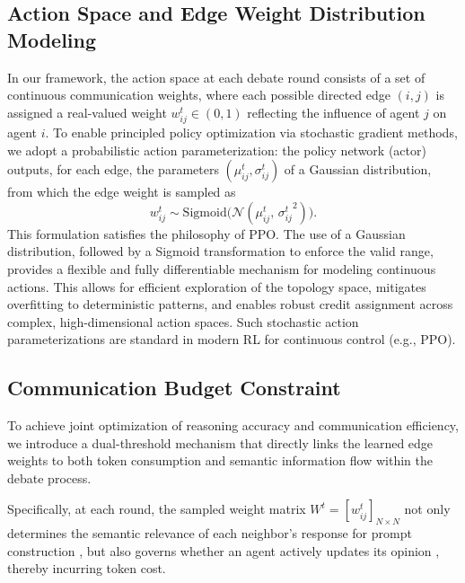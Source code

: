 \subsection{Action Space and Edge Weight Distribution Modeling}

In our framework, the action space at each debate round consists of a set of continuous communication weights, where each possible directed edge $(i, j)$ is assigned a real-valued weight $w_{ij}^t \in (0, 1)$ reflecting the influence of agent $j$ on agent $i$. To enable principled policy optimization via stochastic gradient methods, we adopt a probabilistic action parameterization: the policy network (actor) outputs, for each edge, the parameters $(\mu_{ij}^t, \sigma_{ij}^t)$ of a Gaussian distribution, from which the edge weight is sampled as
\begin{equation}
w_{ij}^t \sim \mathrm{Sigmoid}\big(\mathcal{N}(\mu_{ij}^t,\, {\sigma_{ij}^t}^2)\big).
\label{eq:weight_definition}
\end{equation}
This formulation satisfies the philosophy of PPO. The use of a Gaussian distribution, followed by a Sigmoid transformation to enforce the valid range, provides a flexible and fully differentiable mechanism for modeling continuous actions. This allows for efficient exploration of the topology space, mitigates overfitting to deterministic patterns, and enables robust credit assignment across complex, high-dimensional action spaces. Such stochastic action parameterizations are standard in modern RL for continuous control (e.g., PPO). 


\subsection{Communication Budget Constraint}

To achieve joint optimization of reasoning accuracy and communication efficiency, we introduce a dual-threshold mechanism that directly links the learned edge weights to both token consumption and semantic information flow within the debate process. 

Specifically, at each round, the sampled weight matrix $W^t = [w_{ij}^t]_{N \times N}$ not only determines the semantic relevance of each neighbor's response for prompt construction , but also governs whether an agent actively updates its opinion  , thereby incurring token cost.

